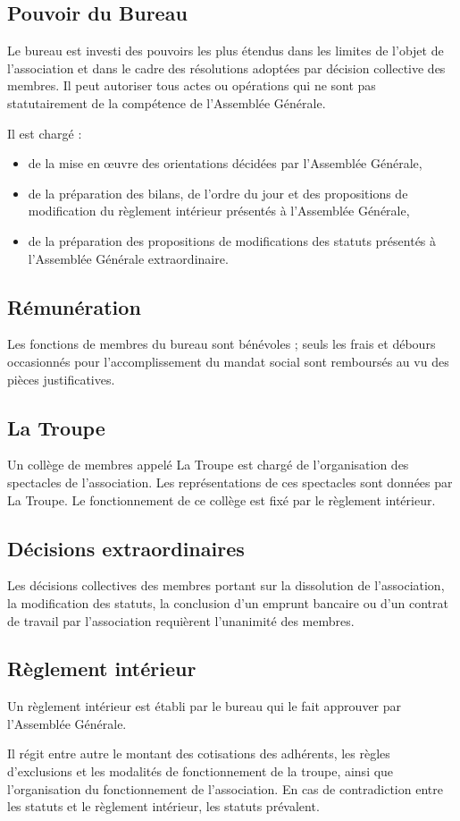 \documentclass[a4paper,french,10pt]{article}
\newcommand{\article}[1]{\subsection{#1}\addtocounter{article}{1}}
\newcounter{article}
\begin{document}
\article{Pouvoir du Bureau}
\label{sec:pouvoirs}
Le bureau est investi des pouvoirs les plus étendus dans les limites
de l’objet de l’association et dans le cadre des résolutions adoptées
par décision collective des membres. Il peut autoriser tous actes ou
opérations qui ne sont pas statutairement de la compétence de
l’Assemblée Générale.

Il est chargé :
\begin{itemize}
\item de la mise en \oe{}uvre des orientations décidées par l'Assemblée
  Générale,

  \item de la préparation des bilans, de l'ordre du jour et des
  propositions de modification du règlement intérieur présentés à
  l'Assemblée Générale,

  \item de la préparation des propositions de modifications des statuts
  présentés à l'Assemblée Générale extraordinaire.
\end{itemize}


\article{Rémunération}
\label{sec:remuneration}
Les fonctions de membres du bureau sont bénévoles ; seuls les frais et
débours occasionnés pour l’accomplissement du mandat social sont
remboursés au vu des pièces justificatives.

\article{La Troupe}
\label{sec:troupe}
Un collège de membres appelé \og{}La Troupe\fg{} est chargé de l'organisation des spectacles de l'association. Les représentations de ces spectacles sont données par La Troupe. Le fonctionnement de ce collège est fixé par le règlement intérieur.

\article{Décisions extraordinaires}
\label{sec:decisions-extra}
Les décisions collectives des membres portant sur la dissolution de
l’association, la modification des statuts, la conclusion d’un emprunt
bancaire ou d’un contrat de travail par l’association requièrent
l’unanimité des membres.

\article{Règlement intérieur}
\label{sec:reglement}
Un règlement intérieur est établi par le bureau qui le fait approuver
par l’Assemblée Générale.

Il régit entre autre le montant des cotisations des adhérents, les règles d'exclusions et les modalités de fonctionnement de la troupe, ainsi que l'organisation du fonctionnement de l'association. En cas de contradiction entre les statuts et le règlement intérieur, les statuts prévalent.

\end{document}
